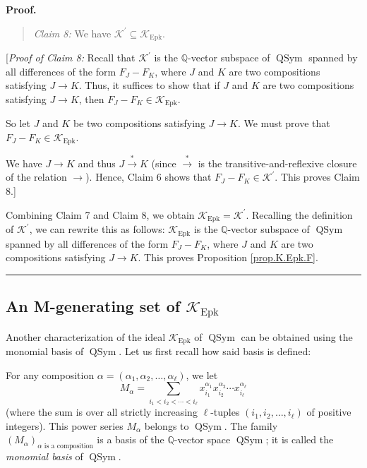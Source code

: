 \documentclass[numbers=enddot,12pt,final,onecolumn,notitlepage]{scrartcl}%
\theoremstyle{definition}
\newenvironment{statement}{\begin{quote}}{\end{quote}}
\newenvironment{proof}[1][Proof]{\noindent\textbf{#1.} }{\ \rule{0.5em}{0.5em}}
\newenvironment{verlong}{}{}
\let\sumnonlimits\sum
\renewcommand{\sum}{\sumnonlimits\limits}
\begin{document}
\begin{verlong}
\begin{proof}
\begin{statement}
\textit{Claim 8:} We have $\mathcal{K}^{\prime}\subseteq\mathcal{K}%
_{\operatorname*{Epk}}$.
\end{statement}

[\textit{Proof of Claim 8:} Recall that $\mathcal{K}^{\prime}$ is the
$\mathbb{Q}$-vector subspace of $\operatorname*{QSym}$ spanned by all
differences of the form $F_{J}-F_{K}$, where $J$ and $K$ are two compositions
satisfying $J\rightarrow K$. Thus, it suffices to show that if $J$ and $K$ are
two compositions satisfying $J\rightarrow K$, then $F_{J}-F_{K}\in
\mathcal{K}_{\operatorname*{Epk}}$.

So let $J$ and $K$ be two compositions satisfying $J\rightarrow K$. We must
prove that $F_{J}-F_{K}\in\mathcal{K}_{\operatorname*{Epk}}$.

We have $J\rightarrow K$ and thus $J\overset{\ast}{\rightarrow}K$ (since
$\overset{\ast}{\rightarrow}$ is the transitive-and-reflexive closure of the
relation $\rightarrow$). Hence, Claim 6 shows that $F_{J}-F_{K}\in
\mathcal{K}^{\prime}$. This proves Claim 8.]

Combining Claim 7 and Claim 8, we obtain $\mathcal{K}_{\operatorname*{Epk}%
}=\mathcal{K}^{\prime}$. Recalling the definition of $\mathcal{K}^{\prime}$,
we can rewrite this as follows: $\mathcal{K}_{\operatorname*{Epk}}$ is the
$\mathbb{Q}$-vector subspace of $\operatorname*{QSym}$ spanned by all
differences of the form $F_{J}-F_{K}$, where $J$ and $K$ are two compositions
satisfying $J\rightarrow K$. This proves Proposition \ref{prop.K.Epk.F}.
\end{proof}
\end{verlong}

\subsection{An M-generating set of $\mathcal{K}_{\operatorname*{Epk}}$}

Another characterization of the ideal $\mathcal{K}_{\operatorname*{Epk}}$ of
$\operatorname*{QSym}$ can be obtained using the monomial basis of
$\operatorname*{QSym}$. Let us first recall how said basis is defined:

For any composition $\alpha=\left(  \alpha_{1},\alpha_{2},\ldots,\alpha_{\ell
}\right)  $, we let%
\[
M_{\alpha}=\sum_{i_{1}<i_{2}<\cdots<i_{\ell}}x_{i_{1}}^{\alpha_{1}}x_{i_{2}%
}^{\alpha_{2}}\cdots x_{i_{\ell}}^{\alpha_{\ell}}%
\]
(where the sum is over all strictly increasing $\ell$-tuples $\left(
i_{1},i_{2},\ldots,i_{\ell}\right)  $ of positive integers). This power series
$M_{\alpha}$ belongs to $\operatorname*{QSym}$. The family $\left(  M_{\alpha
}\right)  _{\alpha\text{ is a composition}}$ is a basis of the $\mathbb{Q}%
$-vector space $\operatorname*{QSym}$; it is called the \textit{monomial
basis} of $\operatorname*{QSym}$.
\end{document}
